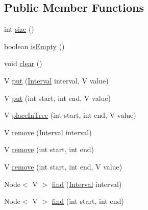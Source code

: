 \subsection*{Public Member Functions}
\begin{DoxyCompactItemize}
\item 
int \hyperlink{classbroad_1_1core_1_1datastructures_1_1_interval_tree_3_01_v_01_4_a44cc85e85bbdb4f69970c9433039960c}{size} ()
\item 
boolean \hyperlink{classbroad_1_1core_1_1datastructures_1_1_interval_tree_3_01_v_01_4_a8b579056a7540902bb270ecf9f8b47fa}{is\+Empty} ()
\item 
void \hyperlink{classbroad_1_1core_1_1datastructures_1_1_interval_tree_3_01_v_01_4_a372b459843c74a5c78e19f6625051ef2}{clear} ()
\item 
V \hyperlink{classbroad_1_1core_1_1datastructures_1_1_interval_tree_3_01_v_01_4_ab4e3d991900d0af7e9184af6db46340c}{put} (\hyperlink{interfacebroad_1_1core_1_1datastructures_1_1_interval}{Interval} interval, V value)
\item 
V \hyperlink{classbroad_1_1core_1_1datastructures_1_1_interval_tree_3_01_v_01_4_ab287d3a2ad3be3c340ea658e0d00802f}{put} (int start, int end, V value)
\item 
V \hyperlink{classbroad_1_1core_1_1datastructures_1_1_interval_tree_3_01_v_01_4_a0a975b5d12ca43c424a1a768c1fb976b}{place\+In\+Tree} (int start, int end, V value)
\item 
V \hyperlink{classbroad_1_1core_1_1datastructures_1_1_interval_tree_3_01_v_01_4_ae7de7baca6d327a044410ec6e5a13966}{remove} (\hyperlink{interfacebroad_1_1core_1_1datastructures_1_1_interval}{Interval} interval)
\item 
V \hyperlink{classbroad_1_1core_1_1datastructures_1_1_interval_tree_3_01_v_01_4_ae00466c38ed06216ca5b913a1f57b5c6}{remove} (int start, int end)
\item 
V \hyperlink{classbroad_1_1core_1_1datastructures_1_1_interval_tree_3_01_v_01_4_a0d6cb2b2fd4a3248d77dbdb0569709ea}{remove} (int start, int end, V value)
\item 
Node$<$ V $>$ \hyperlink{classbroad_1_1core_1_1datastructures_1_1_interval_tree_3_01_v_01_4_a62fd139e37c45f014646e5f83f558b74}{find} (\hyperlink{interfacebroad_1_1core_1_1datastructures_1_1_interval}{Interval} interval)
\item 
Node$<$ V $>$ \hyperlink{classbroad_1_1core_1_1datastructures_1_1_interval_tree_3_01_v_01_4_acb4706953b943da415d82debbd79c755}{find} (int start, int end)
\item 

\end{DoxyCompactItemize}
